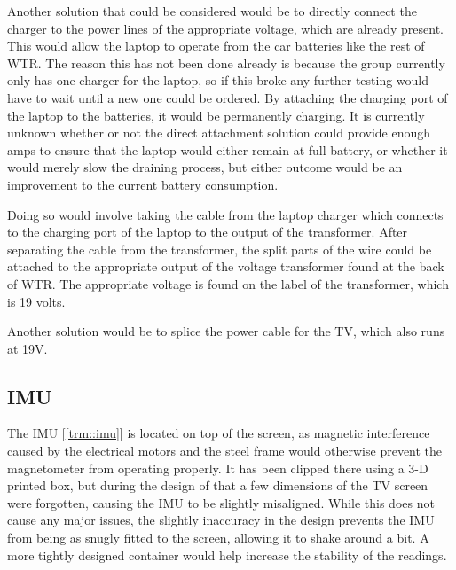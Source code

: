 Another solution that could be considered would be to directly connect the charger to the power lines of the appropriate voltage, which are already present.
This would allow the laptop to operate from the car batteries like the rest of WTR.
The reason this has not been done already is because the group currently only has one charger for the laptop, so if this broke any further testing would have to wait until a new one could be ordered.
By attaching the charging port of the laptop to the batteries, it would be permanently charging.
It is currently unknown whether or not the direct attachment solution could provide enough amps to ensure that the laptop would either remain at full battery, or whether it would merely slow the draining process, but either outcome would be an improvement to the current battery consumption.

Doing so would involve taking the cable from the laptop charger which connects to the charging port of the laptop to the output of the transformer.
After separating the cable from the transformer, the split parts of the wire could be attached to the appropriate output of the voltage transformer found at the back of WTR.
The appropriate voltage is found on the label of the transformer, which is 19 volts.

Another solution would be to splice the power cable for the TV, which also runs at 19V.


\subsection{IMU}
The IMU [\ref{trm::imu}] is located on top of the screen, as magnetic interference caused by the electrical motors and the steel frame would otherwise prevent the magnetometer from operating properly.
It has been clipped there using a 3-D printed box, but during the design of that a few dimensions of the TV screen were forgotten, causing the IMU to be slightly misaligned.
While this does not cause any major issues, the slightly inaccuracy in the design prevents the IMU from being as snugly fitted to the screen, allowing it to shake around a bit.
A more tightly designed container would help increase the stability of the readings.

\newpage

